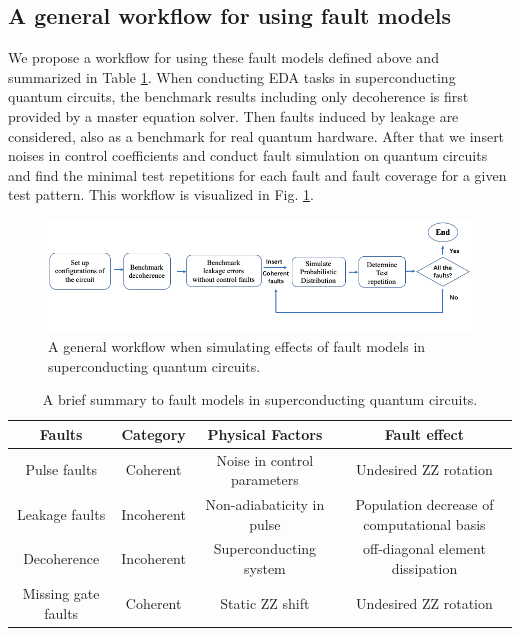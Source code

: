 \documentclass[conference, 9pt]{IEEEtran}
\begin{document}
\subsection{A general workflow for using fault models}
We propose a workflow for using these fault models defined above and summarized in Table \ref{tab:faultmodel}. When conducting EDA tasks in superconducting quantum circuits, the benchmark results including only decoherence is first provided by a master equation solver. Then faults induced by leakage are considered, also as a benchmark for real quantum hardware. After that we insert noises in control coefficients and conduct fault simulation on quantum circuits and find the minimal test repetitions for each fault and fault coverage for a given test pattern. This workflow is visualized in Fig. \ref{fig:workflow}. 
\begin{figure}
    \centering
    \includegraphics[width = .85\linewidth]{Figures/workflow.png}
    \caption{A general workflow when simulating effects of fault models in superconducting quantum circuits.}
    \label{fig:workflow}
\end{figure}

\begin{table}[]
    \centering
    \begin{tabular}{c|c|c|c}
    \toprule
        Faults & Category &Physical Factors &Fault effect\\
        \midrule
        Pulse faults & Coherent & Noise in control parameters & Undesired ZZ rotation \\
        Leakage faults & Incoherent & Non-adiabaticity in pulse & Population decrease of computational basis \\
        Decoherence & Incoherent & Superconducting system & off-diagonal element dissipation \\
        Missing gate faults & Coherent & Static ZZ shift & Undesired ZZ rotation \\
    \bottomrule
    \end{tabular}
    \caption{A brief summary to fault models in superconducting quantum circuits.}
    \label{tab:faultmodel}
\end{table}
\end{document}
